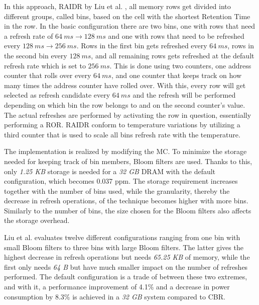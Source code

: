 In this approach, RAIDR by Liu et al. \cite{raidr}, all memory rows get divided into different groups, called bins, based on the cell with the shortest Retention Time in the row. In the basic configuration there are two bins, one with rows that need a refresh rate of $64\:ms \to 128\:ms$ and one with rows that need to be refreshed every $128\:ms \to 256\:ms$. Rows in the first bin gets refreshed every $64\:ms$, rows in the second bin every $128\:ms$, and all remaining rows gets refreshed at the default refresh rate which is set to $256\:ms$. This is done using two counters, one address counter that rolls over every $64\:ms$, and one counter that keeps track on how many times the address counter have rolled over. With this, every row will get selected as refresh candidate every $64\:ms$ and the refresh will be performed depending on which bin the row belongs to and on the second counter's value. The actual refreshes are performed by activating the row in question, essentially performing a ROR. RAIDR conform to temperature variations by utilizing a third counter that is used to scale all bins refresh rate with the temperature.

The implementation is realized by modifying the MC. To minimize the storage needed for keeping track of bin members, Bloom filters are used. Thanks to this, only \textit{1.25 KB} storage is needed for a \textit{32 GB} DRAM with the default configuration, which becomes 0.037 ppm. The storage requirement increases together with the number of bins used, while the granularity, thereby the decrease in refresh operations, of the technique becomes higher with more bins. Similarly to the number of bins, the size chosen for the Bloom filters also affects the storage overhead. 

Liu et al. evaluates twelve different configurations ranging from one bin with small Bloom filters to three bins with large Bloom filters. The latter gives the highest decrease in refresh operations but needs \textit{65.25 KB} of memory, while the first only needs \textit{64 B} but have much smaller impact on the number of refreshes performed. The default configuration is a trade of between these two extremes, and with it, a performance improvement of 4.1\% and a decrease in power consumption by 8.3\% is achieved in a \textit{32 GB} system compared to CBR.